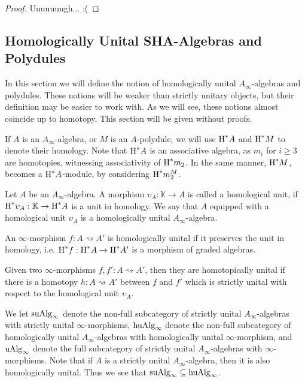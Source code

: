 \documentclass[../thesis.tex]{subfiles}
\begin{document}
            \begin{proof}
                Uuuuuuugh... :(
            \end{proof}

        \subsection{Homologically Unital SHA-Algebras and Polydules}

            In this section we will define the notion of homologically unital $A_\infty$-algebras and polydules. These notions will be weaker than strictly unitary objects, but their definition may be easier to work with. As we will see, these notions almost coincide up to homotopy. This section will be given without proofs.

            If $A$ is an $A_\infty$-algebra, or $M$ is an $A$-polydule, we will use $\tt{H}^*A$ and $\tt{H}^*M$ to denote their homology. Note that $\tt{H}^*A$ is an associative algebra, as $m_i$ for $i \geq 3$ are homotopies, witnessing associativity of $\tt{H}^*m_2$. In the same manner, $\tt{H}^*M$, becomes a $\tt{H}^*A$-module, by considering $\tt{H}^*m_2^M$.

            \begin{definition}
                Let $A$ be an $A_\infty$-algebra. A morphism $\upsilon_A : \mathbb{K} \rightarrow A$ is called a homological unit, if $\tt{H}^*\upsilon_A : \mathbb{K} \rightarrow \tt{H}^*A$ is a unit in homology. We say that $A$ equipped with a homological unit $\upsilon_A$ is a homologically unital $A_\infty$-algebra.

                An $\infty$-morphism $f : A \rightsquigarrow A'$ is homologically unital if it preserves the unit in homology, i.e. $\tt{H}^*f : \tt{H}^*A \rightarrow \tt{H}^*A'$ is a morphism of graded algebras.

                Given two $\infty$-morphisms $f,f' : A \rightsquigarrow A'$, then they are homotopically unital if there is a homotopy $h : A \rightsquigarrow A'$ between $f$ and $f'$ which is strictly unital with respect to the homological unit $\upsilon_A$. 
            \end{definition}

            We let $\tt{suAlg}_\infty$ denote the non-full subcategory of strictly unital $A_\infty$-algebras with strictly unital $\infty$-morphisms, $\tt{huAlg}_\infty$ denote the non-full subcategory of homologically unital $A_\infty$-algebras with homologically unital $\infty$-morphism, and $\tt{uAlg}_\infty$ denote the full subcategory of strictly unital $A_\infty$-algebras with $\infty$-morphisms. Note that if $A$ is a strictly unital $A_\infty$-algebra, then it is also homologically unital. Thus we see that $\tt{suAlg}_\infty \subseteq \tt{huAlg}_\infty$.
\end{document}
